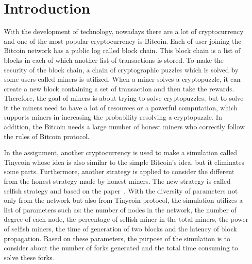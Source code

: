 \documentclass[runningheads,a4paper]{llncs}
\begin{document}
\mainmatter  


\newpage
\tableofcontents
\newpage


\section{Introduction}
\label{Intro}

With the development of technology, nowadays there are a lot of cryptocurrency and one of the most popular cryptocurrency is Bitcoin. 
Each of user joining the Bitcoin network has a public log called block chain.
This block chain is a list of blocks in each of which another list of transactions is stored.
To make the security of the block chain, a chain of cryptographic puzzles which is solved by some users called miners is utilized.
When a miner solves a cryptopuzzle, it can create a new block containing a set of transaction and then take the rewards.
Therefore, the goal of miners is about trying to solve cryptopuzzles, but to solve it the miners need to have a lot of resources or a powerful computation, which supports miners in increasing the probability resolving a cryptopuzzle.
In addition, the Bitcoin needs a large number of honest miners who correctly follow the rules of Bitcoin protocol.

In the assignment, another cryptocurrency is used to make a simulation called Tinycoin whose idea is also similar to the simple Bitcoin's idea, but it eliminates some parts.
Furthermore, another strategy is applied to consider the different from the honest strategy made by honest miners.
The new strategy is called selfish strategy and based on the paper~\cite{eyal2014majority}.
With the diversity of parameters not only from the network but also from Tinycoin protocol, the simulation utilizes a list of parameters such as: the number of nodes in the network, the number of degree of each node, the percentage of selfish miner in the total miners, the power of selfish miners, the time of generation of two blocks and the latency of block propagation.
Based on these parameters, the purpose of the simulation is to consider about the number of forks generated and the total time consuming to solve these forks.
\end{document}
